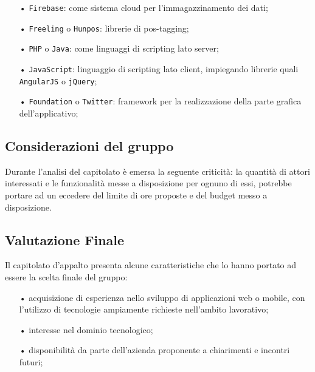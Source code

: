 \begin{itemize}
\item[•] \texttt{Firebase}: come sistema cloud per l'immagazzinamento dei dati;

\item[•] \texttt{Freeling} o \texttt{Hunpos}: librerie di pos-tagging;

\item[•] \texttt{PHP} o \texttt{Java}: come linguaggi di scripting lato server;

\item[•] \texttt{JavaScript}: linguaggio di scripting lato client, impiegando librerie quali \texttt{AngularJS} o \texttt{jQuery};

\item[•] \texttt{Foundation} o \texttt{Twitter}: framework per la realizzazione della parte grafica dell’applicativo;

\end{itemize}

\subsection{Considerazioni del gruppo}
Durante l’analisi del capitolato è emersa la seguente criticità:
la quantità di attori interessati e le funzionalità messe a disposizione per ognuno di essi, potrebbe portare ad un eccedere del limite di ore proposte e del budget messo a disposizione.

\subsection{Valutazione Finale}

Il capitolato d’appalto presenta alcune caratteristiche che lo hanno portato ad essere
la scelta finale del gruppo:
\begin{itemize}
\item[•] acquisizione di esperienza nello sviluppo di applicazioni web o mobile, con l’utilizzo di tecnologie
ampiamente richieste nell’ambito lavorativo;
\item[•] interesse nel dominio tecnologico;
\item[•] disponibilità da parte dell'azienda proponente a chiarimenti e incontri futuri; 

\end{itemize}

